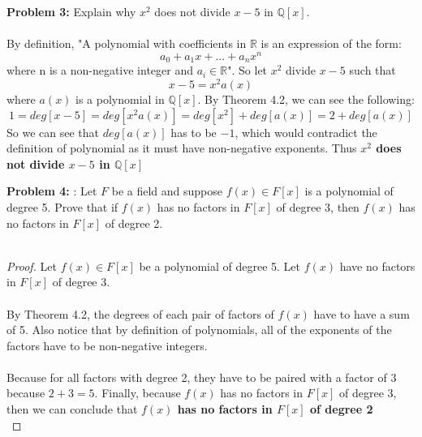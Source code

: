 \documentclass[12pt]{article}
\begin{document}
\newpage

\noindent \textbf{Problem 3: }Explain why $x^2$ does not divide $x - 5$ in $\mathbb{Q}[x]$.
\\ \\
By definition, "A polynomial with coefficients in $\mathbb{R}$ is an expression of the form:
	$$
	a_0 + a_1x + ... + a_nx^n
	$$
where n is a non-negative integer and $a_i \in \mathbb{R}$". So let $x^2$ divide $x-5$ such that
	$$
	x - 5 = x^2a(x)
	$$
where $a(x)$ is a polynomial in $\mathbb{Q}[x]$.  By Theorem 4.2, we can see the following:
	$$
	1 = deg[x-5] = deg[x^2a(x)] = deg[x^2] + deg[a(x)] = 2 + deg[a(x)]
	$$
So we can see that $deg[a(x)]$ has to be $-1$, which would contradict the definition of polynomial as it must have non-negative exponents.  Thus \textbf{\boldmath $x^2$ does not divide $x - 5$ in $\mathbb{Q}[x]$}


\newpage

\noindent\textbf{Problem 4: }: Let $F$ be a field and suppose $f(x) \in F[x]$ is a polynomial of degree 5. Prove
that if $f(x)$ has no factors in $F[x]$ of degree 3, then $f(x)$ has no factors in $F[x]$ of degree 2.
\\ \\
	\begin{proof}
		Let $f(x) \in F[x]$ be a polynomial of degree 5. Let $f(x)$ have no factors in $F[x]$ of degree 3.
		\\ \\
		By Theorem 4.2, the degrees of each pair of factors of $f(x)$ have to have a sum of 5. Also notice that by definition of polynomials, all of the exponents of the factors have to be non-negative integers.
		\\ \\
		Because for all factors with degree 2, they have to be paired with a factor of 3 because $2+3=5$. Finally, because $f(x)$ has no factors in $F[x]$ of degree 3, then we can conclude that \textbf{\boldmath $f(x)$ has no factors in $F[x]$ of degree 2} \\
	\end{proof}

\newpage
\end{document}
